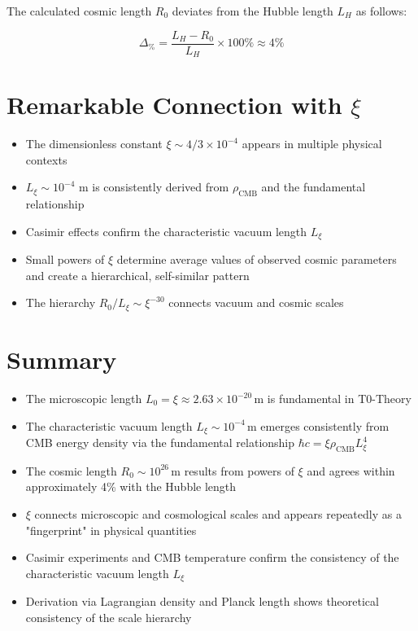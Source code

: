 \documentclass[12pt,a4paper]{article}
\numberwithin{equation}{section}
\begin{document}
	The calculated cosmic length $R_0$ deviates from the Hubble length $L_H$ as follows:
	
	\[
	\Delta_{\%} = \frac{L_H - R_0}{L_H} \times 100\% \approx 4\%
	\]
	
	\section{Remarkable Connection with $\xi$}
	
	\begin{itemize}
		\item The dimensionless constant $\xi \sim 4/3 \times 10^{-4}$ appears in multiple physical contexts
		\item $L_\xi \sim 10^{-4}$ m is consistently derived from $\rho_{\text{CMB}}$ and the fundamental relationship
		\item Casimir effects confirm the characteristic vacuum length $L_\xi$
		\item Small powers of $\xi$ determine average values of observed cosmic parameters and create a hierarchical, self-similar pattern
		\item The hierarchy $R_0 / L_\xi \sim \xi^{-30}$ connects vacuum and cosmic scales
	\end{itemize}
	
	\section{Summary}
	
	\begin{itemize}
		\item The microscopic length $L_0 = \xi \approx 2.63 \times 10^{-20}\,\text{m}$ is fundamental in T0-Theory
		\item The characteristic vacuum length $L_\xi \sim 10^{-4}\,\text{m}$ emerges consistently from CMB energy density via the fundamental relationship $\hbar c = \xi \rho_{\text{CMB}} L_\xi^4$
		\item The cosmic length $R_0 \sim 10^{26}\,\text{m}$ results from powers of $\xi$ and agrees within approximately 4\% with the Hubble length
		\item $\xi$ connects microscopic and cosmological scales and appears repeatedly as a "fingerprint" in physical quantities
		\item Casimir experiments and CMB temperature confirm the consistency of the characteristic vacuum length $L_\xi$
		\item Derivation via Lagrangian density and Planck length shows theoretical consistency of the scale hierarchy
	\end{itemize}
	
\end{document}
